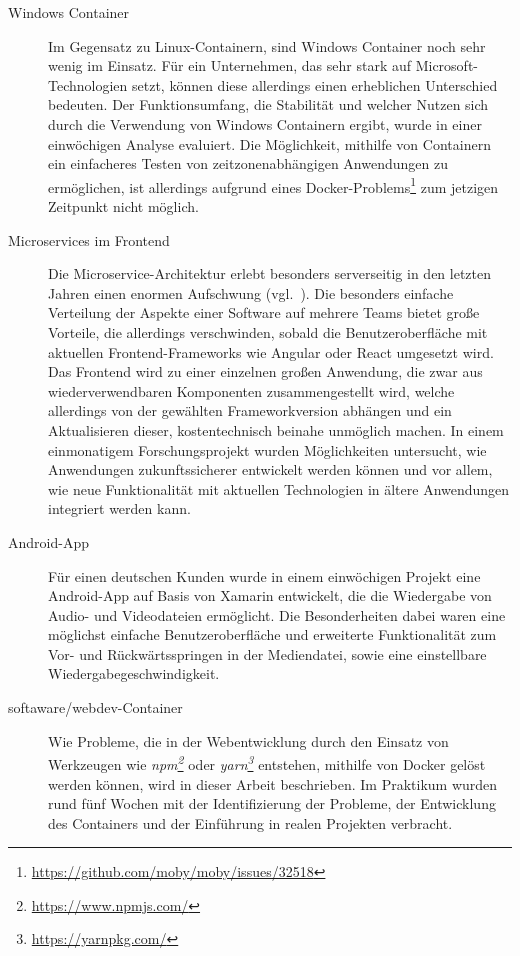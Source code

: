 \begin{description}
    \item [Windows Container]
    Im Gegensatz zu Linux-Containern, sind Windows Container noch sehr wenig im Einsatz.
    Für ein Unternehmen, das sehr stark auf Microsoft-Technologien setzt, können diese allerdings einen erheblichen Unterschied bedeuten.
    Der Funktionsumfang, die Stabilität und welcher Nutzen sich durch die Verwendung von Windows Containern ergibt, wurde in einer einwöchigen Analyse evaluiert.
    Die Möglichkeit, mithilfe von Containern ein einfacheres Testen von zeitzonenabhängigen Anwendungen zu ermöglichen, ist allerdings aufgrund eines Docker-Problems\footnote{\url{https://github.com/moby/moby/issues/32518}} zum jetzigen Zeitpunkt nicht möglich.
    \item [Microservices im Frontend]
    Die Microservice-Architektur erlebt besonders serverseitig in den letzten Jahren einen enormen Aufschwung (vgl.~\autocite{Fowler.Microservices:online}).
    Die besonders einfache Verteilung der Aspekte einer Software auf mehrere Teams bietet große Vorteile, die allerdings verschwinden, sobald die Benutzeroberfläche mit aktuellen Frontend-Frameworks wie Angular oder React umgesetzt wird.
    Das Frontend wird zu einer einzelnen großen Anwendung, die zwar aus wiederverwendbaren Komponenten zusammengestellt wird, welche allerdings von der gewählten Frameworkversion abhängen und ein Aktualisieren dieser, kostentechnisch beinahe unmöglich machen.
    In einem einmonatigem Forschungsprojekt wurden Möglichkeiten untersucht, wie Anwendungen zukunftssicherer entwickelt werden können und vor allem, wie neue Funktionalität mit aktuellen Technologien in ältere Anwendungen integriert werden kann.
    \item [Android-App]
    Für einen deutschen Kunden wurde in einem einwöchigen Projekt eine Android-App auf Basis von Xamarin entwickelt, die die Wiedergabe von Audio- und Videodateien ermöglicht.
    Die Besonderheiten dabei waren eine möglichst einfache Benutzeroberfläche und erweiterte Funktionalität zum Vor- und Rückwärtsspringen in der Mediendatei, sowie eine einstellbare Wiedergabegeschwindigkeit.
    \item [softaware/webdev-Container]
    Wie Probleme, die in der Webentwicklung durch den Einsatz von Werkzeugen wie \emph{npm\footnote{\url{https://www.npmjs.com/}}} oder \emph{yarn\footnote{\url{https://yarnpkg.com/}}} entstehen, mithilfe von Docker gelöst werden können, wird in dieser Arbeit beschrieben.
    Im Praktikum wurden rund fünf Wochen mit der Identifizierung der Probleme, der Entwicklung des Containers und der Einführung in realen Projekten verbracht.
\end{description}
